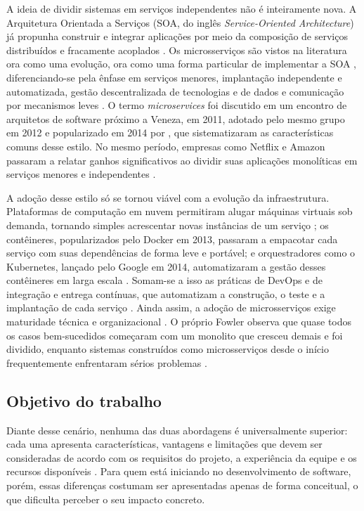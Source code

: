 \documentclass[12pt]{article}
\begin{document}
A ideia de dividir sistemas em serviços independentes não é inteiramente nova. A Arquitetura Orientada a Serviços (SOA, do inglês \textit{Service-Oriented Architecture}) já propunha construir e integrar aplicações por meio da composição de serviços distribuídos e fracamente acoplados \cite{azevedo:2020}. Os microsserviços são vistos na literatura ora como uma evolução, ora como uma forma particular de implementar a SOA \cite{azevedo:2020,lucio:2017}, diferenciando-se pela ênfase em serviços menores, implantação independente e automatizada, gestão descentralizada de tecnologias e de dados e comunicação por mecanismos leves \cite{lewis:2014}. O termo \textit{microservices} foi discutido em um encontro de arquitetos de software próximo a Veneza, em 2011, adotado pelo mesmo grupo em 2012 e popularizado em 2014 por \cite{lewis:2014}, que sistematizaram as características comuns desse estilo. No mesmo período, empresas como Netflix e Amazon passaram a relatar ganhos significativos ao dividir suas aplicações monolíticas em serviços menores e independentes \cite{newman:2015,cintra:2025}.

A adoção desse estilo só se tornou viável com a evolução da infraestrutura. Plataformas de computação em nuvem permitiram alugar máquinas virtuais sob demanda, tornando simples acrescentar novas instâncias de um serviço \cite{valente:2020}; os contêineres, popularizados pelo Docker em 2013, passaram a empacotar cada serviço com suas dependências de forma leve e portável; e orquestradores como o Kubernetes, lançado pelo Google em 2014, automatizaram a gestão desses contêineres em larga escala \cite{silva:2023}. Somam-se a isso as práticas de DevOps e de integração e entrega contínuas, que automatizam a construção, o teste e a implantação de cada serviço \cite{ciriano:2025}. Ainda assim, a adoção de microsserviços exige maturidade técnica e organizacional \cite{ciriano:2025}. O próprio Fowler observa que quase todos os casos bem-sucedidos começaram com um monolito que cresceu demais e foi dividido, enquanto sistemas construídos como microsserviços desde o início frequentemente enfrentaram sérios problemas \cite{fowler:2015}.

\subsection{Objetivo do trabalho}

Diante desse cenário, nenhuma das duas abordagens é universalmente superior: cada uma apresenta características, vantagens e limitações que devem ser consideradas de acordo com os requisitos do projeto, a experiência da equipe e os recursos disponíveis \cite{borges:2025}. Para quem está iniciando no desenvolvimento de software, porém, essas diferenças costumam ser apresentadas apenas de forma conceitual, o que dificulta perceber o seu impacto concreto.
\end{document}
